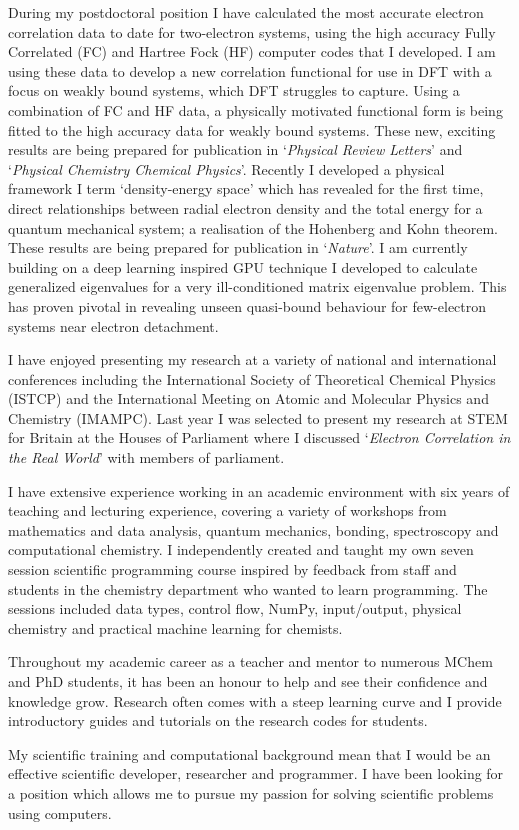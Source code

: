 \documentclass[a4paper]{awesome-cv} %
\begin{document}
\begin{cvletter}
During my postdoctoral position I have calculated the most accurate electron correlation data to date for two-electron systems, using the high accuracy Fully Correlated (FC) and Hartree Fock (HF) computer codes that I developed. I am using these data to develop a new correlation functional for use in DFT with a focus on weakly bound systems, which DFT struggles to capture. Using a combination of FC and HF data, a physically motivated functional form is being fitted to the high accuracy data for weakly bound systems. These new, exciting results are being prepared for publication in `\textit{Physical Review Letters}' and `\textit{Physical Chemistry Chemical Physics}'. Recently I developed a physical framework I term `density-energy space' which has revealed for the first time, direct relationships between radial electron density and the total energy for a quantum mechanical system; a realisation of the Hohenberg and Kohn theorem. These results are being prepared for publication in `\textit{Nature}'. I am currently building on a deep learning inspired GPU technique I developed to calculate generalized eigenvalues for a very ill-conditioned matrix eigenvalue problem. This has proven pivotal in revealing unseen quasi-bound behaviour for few-electron systems near electron detachment.


I have enjoyed presenting my research at a variety of national and international conferences including the International Society of Theoretical Chemical Physics (ISTCP) and the International Meeting on Atomic and Molecular Physics and Chemistry (IMAMPC). Last year I was selected to present my research at STEM for Britain at the Houses of Parliament where I discussed `\textit{Electron Correlation in the Real World}' with members of parliament.


I have extensive experience working in an academic environment with six years of teaching and lecturing experience, covering a variety of workshops from mathematics and data analysis, quantum mechanics, bonding, spectroscopy and computational chemistry. I independently created and taught my own seven session scientific programming course inspired by feedback from staff and students in the chemistry department who wanted to learn programming. The sessions included data types, control flow, NumPy, input/output, physical chemistry and practical machine learning for chemists.


Throughout my academic career as a teacher and mentor to numerous MChem and PhD students, it has been an honour to help and see their confidence and knowledge grow. Research often comes with a steep learning curve and I provide introductory guides and tutorials on the research codes for students. 


My scientific training and computational background mean that I would be an effective scientific developer, researcher and programmer. I have been looking for a position which allows me to pursue my passion for solving scientific problems using computers.

\vspace{-0.2cm}
\end{cvletter}


\makeletterclosing %
\end{document}
